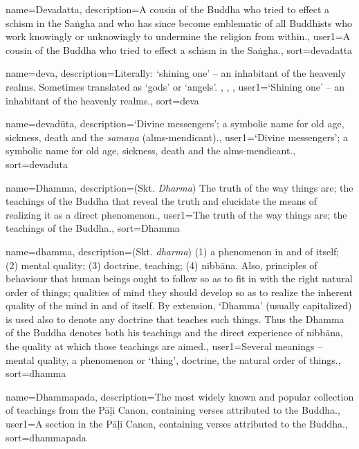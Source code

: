 {
name={Devadatta},
description={A cousin of the Buddha who tried to effect a schism in the Sa\.ngha and who has since become emblematic of all Buddhists who work knowingly or unknowingly to undermine the religion from within.},
user1={A cousin of the Buddha who tried to effect a schism in the Sa\.ngha.},
sort={devadatta}
}

{
name={deva},
description={Literally: `shining one' -- an inhabitant of the heavenly realms. Sometimes translated as `gods' or `angels'. \protect \seepre %
\protect {}, \protect {}, \protect {}%
\protect \seepost %
},
user1={`Shining one' -- an inhabitant of the heavenly realms.},
sort={deva}
}

{
name=devad\=uta,
description={`Divine messengers'; a symbolic name for old age, sickness, death and the \textit{sama\d{n}a} (alms-mendicant).},
user1={`Divine messengers'; a symbolic name for old age, sickness, death and the alms-mendicant.},
sort={devaduta}
}

{
name=Dhamma,
description={(Skt. \textit{Dharma}) The truth of the way things are; the teachings of the Buddha that reveal the truth and elucidate the means of realizing it as a direct phenomenon.},
user1={The truth of the way things are; the teachings of the Buddha.},
sort={Dhamma}
}

{
name={dhamma},
description={(Skt. \textit{dharma}) (1) a phenomenon in and of itself; (2) mental quality; (3) doctrine, teaching; (4) nibb\=ana. Also, principles of behaviour that human beings ought to follow so as to fit in with the right natural order of things; qualities of mind they should develop so as to realize the inherent quality of the mind in and of itself. By extension, `Dhamma' (usually capitalized) is used also to denote any doctrine that teaches such things. Thus the Dhamma of the Buddha denotes both his teachings and the direct experience of nibb\=ana, the quality at which those teachings are aimed.},
user1={Several meanings -- mental quality, a phenomenon or `thing', doctrine, the natural order of things.},
sort={dhamma}
}

{
name=Dhammapada,
description={The most widely known and popular collection of teachings from the P\=a\d{l}i Canon, containing verses attributed to the Buddha.},
user1={A section in the P\=a\d{l}i Canon, containing verses attributed to the Buddha.},
sort={dhammapada}
}

